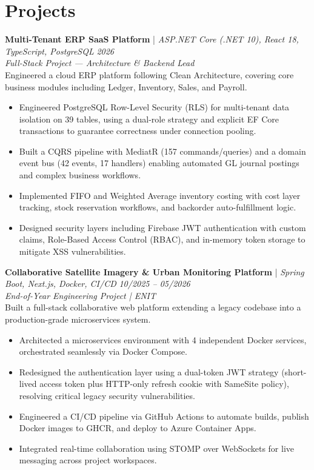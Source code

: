 \documentclass[11pt,a4paper]{article}
\begin{document}
\section{Projects}
\textbf{Multi-Tenant ERP SaaS Platform} | \textit{ASP.NET Core (.NET 10), React 18, TypeScript, PostgreSQL} \hfill \textit{2026} \\
\textit{Full-Stack Project --- Architecture \& Backend Lead} \\
Engineered a cloud ERP platform following Clean Architecture, covering core business modules including Ledger, Inventory, Sales, and Payroll.
\begin{itemize}[leftmargin=*, itemsep=0pt, parsep=0pt, topsep=1pt]
    \item Engineered PostgreSQL Row-Level Security (RLS) for multi-tenant data isolation on 39 tables, using a dual-role strategy and explicit EF Core transactions to guarantee correctness under connection pooling.
    \item Built a CQRS pipeline with MediatR (157 commands/queries) and a domain event bus (42 events, 17 handlers) enabling automated GL journal postings and complex business workflows.
    \item Implemented FIFO and Weighted Average inventory costing with cost layer tracking, stock reservation workflows, and backorder auto-fulfillment logic.
    \item Designed security layers including Firebase JWT authentication with custom claims, Role-Based Access Control (RBAC), and in-memory token storage to mitigate XSS vulnerabilities.
\end{itemize}

\vspace{2pt}
\textbf{Collaborative Satellite Imagery \& Urban Monitoring Platform} | \textit{Spring Boot, Next.js, Docker, CI/CD} \hfill \textit{10/2025 -- 05/2026} \\
\textit{End-of-Year Engineering Project | ENIT} \\
Built a full-stack collaborative web platform extending a legacy codebase into a production-grade microservices system.
\begin{itemize}[leftmargin=*, itemsep=0pt, parsep=0pt, topsep=1pt]
    \item Architected a microservices environment with 4 independent Docker services, orchestrated seamlessly via Docker Compose.
    \item Redesigned the authentication layer using a dual-token JWT strategy (short-lived access token plus HTTP-only refresh cookie with SameSite policy), resolving critical legacy security vulnerabilities.
    \item Engineered a CI/CD pipeline via GitHub Actions to automate builds, publish Docker images to GHCR, and deploy to Azure Container Apps.
    \item Integrated real-time collaboration using STOMP over WebSockets for live messaging across project workspaces.
\end{itemize}
\end{document}
